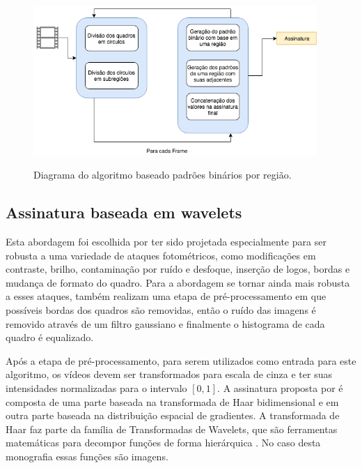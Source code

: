  \begin{figure}[h]
      \centering
      \caption{Diagrama do algoritmo baseado padrões binários por região.}
      \includegraphics[width=0.96\textwidth]{dados/figuras/diagramas/Diag-RBP}
       	\label{fig:dia_rbp}
    \end{figure}  

    
%
%

\subsection{Assinatura baseada em wavelets}
\label{wavelets}

Esta abordagem foi escolhida por ter sido projetada especialmente para ser robusta a uma variedade de ataques fotométricos, como modificações em contraste, brilho, contaminação por ruído e desfoque, inserção de logos, bordas e mudança de formato do quadro. Para a abordagem se tornar ainda mais robusta a esses ataques,  também realizam uma etapa de pré-processamento em que possíveis bordas dos quadros são removidas, então o ruído das imagens é removido através de um filtro gaussiano e finalmente o histograma de cada quadro é equalizado. 

Após a etapa de pré-processamento, para serem utilizados como entrada para este algoritmo, os vídeos devem ser transformados para escala de cinza e ter suas intensidades normalizadas para o intervalo $[0,1]$. A assinatura proposta por  é composta de uma parte baseada na transformada de Haar bidimensional e em outra parte baseada na distribuição espacial de gradientes. A transformada de Haar faz parte da família de Transformadas de Wavelets, que são ferramentas matemáticas para decompor funções de forma hierárquica \cite{stollnitz1995wavelets}. No caso desta monografia essas funções são imagens. 

